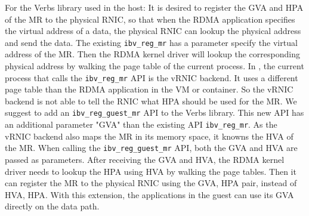 For the Verbs library used in the host: It is desired to register the GVA and HPA of the MR to the physical RNIC, so that when the RDMA application specifies the virtual address of a data, the physical RNIC can lookup the physical address and send the data.
The existing \texttt{ibv\_reg\_mr} has a parameter specify the virtual address of the MR. Then the RDMA kernel driver will lookup the corresponding physical address by walking the page table of the current process.
In \sys, the current process that calls the \texttt{ibv\_reg\_mr} API is the vRNIC backend. It uses a different page table than the RDMA application in the VM or container. So the vRNIC backend is not able to tell the RNIC what HPA should be used for the MR.
We suggest to add an \texttt{ibv\_reg\_guest\_mr} API to the Verbs library. This new API has an additional parameter "GVA" than the existing API \texttt{ibv\_reg\_mr}. As the vRNIC backend also maps the MR in its memory space, it knowns the HVA of the MR. When calling the \texttt{ibv\_reg\_guest\_mr} API, both the GVA and HVA are passed as parameters. After receiving the GVA and HVA, the RDMA kernel driver needs to lookup the HPA using HVA by walking the page tables. Then it can register the MR to the physical RNIC using the {GVA, HPA} pair, instead of {HVA, HPA}.
With this extension, the applications in the guest can use its GVA directly on the data path.
